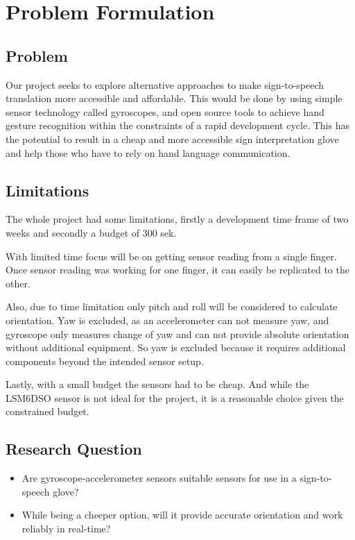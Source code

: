 \section{Problem Formulation}
\subsection{Problem}
\label{subsection:Problems}
Our project seeks to explore alternative approaches to make sign-to-speech translation more accessible and affordable. This would be done by using simple sensor technology called gyroscopes, and open source tools to achieve hand gesture recognition within the constraints of a rapid development cycle. This has the potential to result in a cheap and more accessible sign interpretation glove and help those who have to rely on hand language communication.

\subsection{Limitations}
The whole project had some limitations, firstly a development time frame of two weeks and secondly a budget of 300 sek. 

With limited time focus will be on getting sensor reading from a single finger. Once sensor reading was working for one finger, it can easily be replicated to the other.

Also, due to time limitation only pitch and roll will be considered to calculate orientation. Yaw is excluded, as an accelerometer can not measure yaw, and gyroscope only measures change of yaw and can not provide absolute orientation without additional equipment. So yaw is excluded because it requires additional components beyond the intended sensor setup.

Lastly, with a small budget the sensors had to be cheap. And while the LSM6DSO sensor is not ideal for the project, it is a reasonable choice given the constrained budget\cite{sensor}.

\subsection{Research Question}
\begin{itemize}
    \item Are gyroscope-accelerometer sensors suitable sensors for use in a sign-to-speech glove? \\
    \item While being a cheeper option, will it provide accurate orientation and work reliably in real-time? \\

\end{itemize}